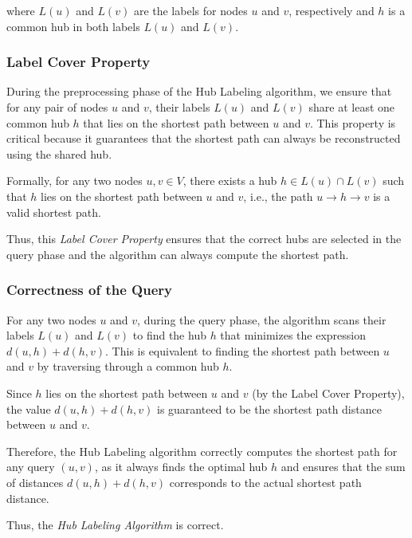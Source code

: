 \begin{appendices}
	where $ L(u) $ and $ L(v) $ are the labels for nodes $ u $ and $ v $, respectively and $ h $ is a common hub in both labels $ L(u) $ and $ L(v) $.
	
	\subsubsection{Label Cover Property}
	
	During the preprocessing phase of the Hub Labeling algorithm, we ensure that for any pair of nodes $ u $ and $ v $, their labels $ L(u) $ and $ L(v) $ share at least one common hub $ h $ that lies on the shortest path between $ u $ and $ v $. This property is critical because it guarantees that the shortest path can always be reconstructed using the shared hub. \medskip
	
	Formally, for any two nodes $ u, v \in V $, there exists a hub $ h \in L(u) \cap L(v) $ such that $ h $ lies on the shortest path between $ u $ and $ v $, i.e., the path $ u \to h \to v $ is a valid shortest path. \medskip
	
	Thus, this \textit{Label Cover Property} ensures that the correct hubs are selected in the query phase and the algorithm can always compute the shortest path.
	
	\subsubsection{Correctness of the Query}
	
	For any two nodes $ u $ and $ v $, during the query phase, the algorithm scans their labels $ L(u) $ and  $ L(v) $ to find the hub $ h $ that minimizes the expression $ d(u, h) + d(h, v) $. This is equivalent to finding the shortest path between $ u $  and $ v $ by traversing through a common hub $ h $. \medskip
	
	Since $ h $ lies on the shortest path between $ u $ and $ v $ (by the Label Cover Property), the value $ d(u, h) + d(h, v) $ is guaranteed to be the shortest path distance between $ u $ and $ v $. \medskip
	
	Therefore, the Hub Labeling algorithm correctly computes the shortest path for any query $ (u, v) $, as it always finds the optimal hub $ h $ and ensures that the sum of distances $ d(u, h) + d(h, v) $ corresponds to the actual shortest path distance.
	
	Thus, the \textit{Hub Labeling Algorithm} is correct.
	





\end{appendices}
